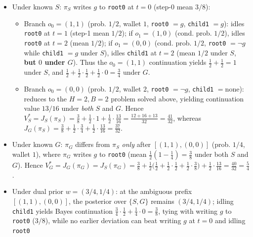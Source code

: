 \documentclass[11pt,a4paper]{article}
\newcounter{none}
\providecommand{\tightlist}{\setlength{\itemsep}{2pt}\setlength{\parskip}{0pt}}
\begin{document}
\begin{itemize}
\tightlist
\item
  Under known \(S\): \(\pi_S\) writes \(g\) to \texttt{root0} at \(t=0\)
  (step-0 mean \(3/8\)):

  \begin{itemize}
  \tightlist
  \item
    Branch \(o_0 = (1,1)\) (prob. \(1/2\), wallet \(1\), \texttt{root0}
    \(=g\), \texttt{child1} \(=g\)): idles \texttt{root0} at \(t=1\)
    (step-1 mean \(1/2\)); if \(o_1 = (1,0)\) (cond. prob. \(1/2\)),
    idles \texttt{root0} at \(t=2\) (mean \(1/2\)); if \(o_1 = (0,0)\)
    (cond. prob. \(1/2\), \texttt{root0} \(=\neg g\) while
    \texttt{child1} \(=g\) under \(S\)), idles \texttt{child1} at
    \(t=2\) (mean \(1/2\) under \(S\), \textbf{but \(0\) under \(G\)}).
    Thus the \(o_0=(1,1)\) continuation yields
    \(\frac{1}{2} + \frac{1}{2} = 1\) under \(S\), and
    \(\frac{1}{2} + \frac{1}{2}\cdot\frac{1}{2} + \frac{1}{2}\cdot 0 = \frac{3}{4}\)
    under \(G\).
  \item
    Branch \(o_0 = (0,0)\) (prob. \(1/2\), wallet \(2\), \texttt{root0}
    \(=\neg g\), \texttt{child1} \(=\mathrm{none}\)): reduces to the
    \(H=2, B=2\) problem solved above, yielding continuation value
    \(13/16\) under \emph{both} \(S\) and \(G\). Hence
    \(V_S^* = J_S(\pi_S) = \frac{3}{8} + \frac{1}{2}\cdot 1 + \frac{1}{2}\cdot\frac{13}{16} = \frac{12 + 16 + 13}{32} = \frac{41}{32}\),
    whereas
    \(J_G(\pi_S) = \frac{3}{8} + \frac{1}{2}\cdot\frac{3}{4} + \frac{1}{2}\cdot\frac{13}{16} = \frac{37}{32}\).
  \end{itemize}
\item
  Under known \(G\): \(\pi_G\) differs from \(\pi_S\) \emph{only} after
  \([(1,1), (0,0)]\) (prob. \(1/4\), wallet \(1\)), where \(\pi_G\)
  writes \(g\) to \texttt{root0} (mean
  \(\frac{1}{2}(1 - \frac{1}{4}) = \frac{3}{8}\) under both \(S\) and
  \(G\)). Hence
  \(V_G^* = J_G(\pi_G) = J_S(\pi_G) = \frac{3}{8} + \frac{1}{2}\bigl(\frac{1}{2} + \frac{1}{2}\cdot\frac{1}{2} + \frac{1}{2}\cdot\frac{3}{8}\bigr) + \frac{1}{2}\cdot\frac{13}{16} = \frac{40}{32} = \frac{5}{4}\).
\item
  Under dual prior \(w = (3/4, 1/4)\): at the ambiguous prefix
  \([(1,1), (0,0)]\), the posterior over \(\{S, G\}\) remains
  \((3/4, 1/4)\); idling \texttt{child1} yields Bayes continuation
  \(\frac{3}{4}\cdot\frac{1}{2} + \frac{1}{4}\cdot 0 = \frac{3}{8}\),
  tying with writing \(g\) to \texttt{root0} (\(3/8\)), while no earlier
  deviation can beat writing \(g\) at \(t=0\) and idling \texttt{root0}

\end{itemize}
\end{document}
